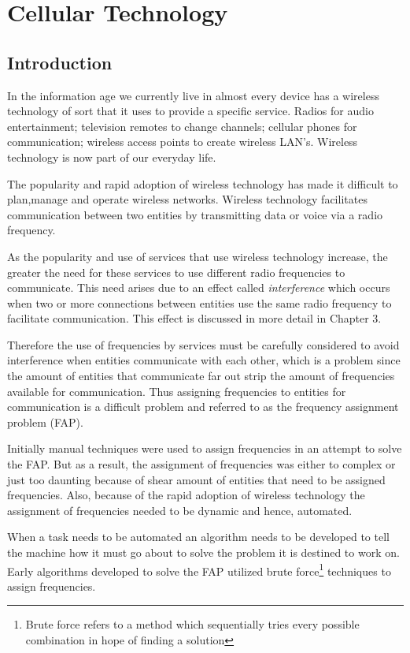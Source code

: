 \chapter{Cellular Technology}
\label{chpt:celltech}
\section{Introduction}
In the information age we currently live in almost every device has a wireless technology of sort that it uses to provide a specific service. Radios for audio entertainment; television remotes to change
channels; cellular phones for communication; wireless access points to create wireless LAN's\cite{Karen2004}. Wireless technology is now part of our everyday life.

The popularity and rapid adoption of wireless technology has made it difficult to plan,manage and operate wireless networks. Wireless technology facilitates communication between two entities by transmitting data or voice via a radio frequency. 

As the popularity and use of services that use wireless technology increase, the greater the need for these services to use different radio frequencies to communicate. This need arises due to an effect called \emph{interference} which occurs when two or more connections between entities use the same radio frequency to facilitate communication. This effect is discussed in more detail in Chapter 3.

Therefore the use of frequencies by services must be carefully considered to avoid interference when entities communicate with each other, which is a problem since the amount of entities that communicate far out strip the amount of frequencies available for communication. Thus assigning frequencies to entities for communication is a difficult problem and referred to as the frequency assignment problem (FAP).

Initially manual techniques were used to assign frequencies in an attempt to solve the FAP. But as a result, the assignment of frequencies was either to complex or just too daunting because of shear amount of entities that need to be assigned frequencies. Also, because of the rapid adoption of wireless technology the assignment of frequencies needed to be dynamic and hence, automated.

When a task needs to be automated an algorithm needs to be developed to tell the machine how it must go about to solve the problem it is destined to work on. Early algorithms developed to solve the FAP utilized brute force\footnote{Brute force refers to a method which sequentially tries every possible combination in hope of finding a solution} techniques to assign frequencies.

